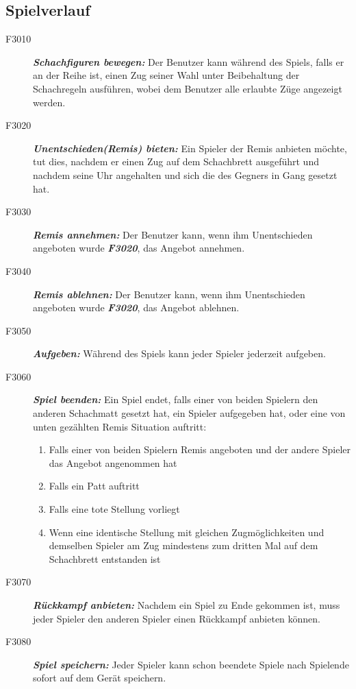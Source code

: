 \documentclass[parskip=full]{scrartcl}
\begin{document}
	\subsection{Spielverlauf} 
	\begin{description}
		\item[F3010]\textbf{\textit{Schachfiguren bewegen: }}Der Benutzer kann während des Spiels, falls er an der Reihe ist, einen Zug seiner Wahl unter Beibehaltung der \gls{Schachregeln} ausführen, wobei dem Benutzer alle erlaubte Züge  angezeigt werden.
		\item[F3020] \textbf{\textit{Unentschieden(Remis) bieten: }} Ein Spieler der Remis anbieten möchte, tut dies, nachdem er einen Zug auf dem Schachbrett ausgeführt und nachdem seine Uhr angehalten und sich die des Gegners in Gang gesetzt hat.
		\item[F3030] \textbf{\textit{Remis annehmen: }} Der Benutzer kann, wenn ihm Unentschieden angeboten wurde \textbf{\textit{F3020}}, das Angebot annehmen.
		
		\item[F3040] \textbf{\textit{Remis ablehnen: }} Der Benutzer kann, wenn ihm Unentschieden angeboten wurde \textbf{\textit{F3020}}, das Angebot ablehnen.
		
		\item[F3050] \textbf{\textit{Aufgeben: }} Während des Spiels kann jeder Spieler jederzeit aufgeben.
		
		\item[F3060] \textbf{\textit{Spiel beenden: }} Ein Spiel endet, falls einer von beiden Spielern den anderen Schachmatt gesetzt hat, ein Spieler aufgegeben hat, oder eine von unten gezählten Remis Situation auftritt:
		\begin{enumerate}	    
			\item Falls einer von beiden Spielern Remis angeboten und der andere Spieler das Angebot angenommen hat
			\item Falls ein \gls{Patt} auftritt
			\item Falls eine \gls{tote Stellung} vorliegt
			\item Wenn eine identische Stellung mit gleichen Zugmöglichkeiten und demselben Spieler am Zug mindestens zum dritten Mal auf dem Schachbrett entstanden ist 
		\end{enumerate}
		\item[F3070] \textbf{\textit{Rückkampf anbieten: }} Nachdem ein Spiel zu Ende gekommen ist, muss jeder Spieler den anderen Spieler einen Rückkampf anbieten können.		
		\item[F3080] \textbf{\textit{Spiel speichern: }}  Jeder Spieler kann schon beendete Spiele nach Spielende sofort auf dem Gerät speichern. 
	\end{description}
	\newpage
\end{document}
